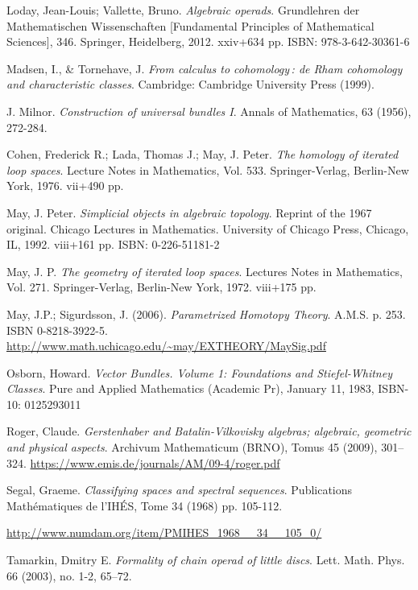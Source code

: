 \documentclass[TFM.tex]{subfiles}
\begin{document}
\begin{thebibliography}{}
 Loday, Jean-Louis; Vallette, Bruno. \emph{Algebraic operads}. Grundlehren der Mathematischen Wissenschaften [Fundamental Principles of Mathematical Sciences], 346. Springer, Heidelberg, 2012. xxiv+634 pp. ISBN: 978-3-642-30361-6

 Madsen, I., \& Tornehave, J. \emph{From calculus to cohomology : de Rham cohomology and characteristic classes}. Cambridge: Cambridge University Press (1999).

 J. Milnor. \emph{Construction of universal bundles I}. Annals of Mathematics, 63 (1956), 272-284. %


 Cohen, Frederick R.; Lada, Thomas J.; May, J. Peter. \emph{The homology of iterated loop spaces}. Lecture Notes in Mathematics, Vol. 533. Springer-Verlag, Berlin-New York, 1976. vii+490 pp. %


  May, J. Peter. \emph{Simplicial objects in algebraic topology}. Reprint of the 1967 original. Chicago Lectures in Mathematics. University of Chicago Press, Chicago, IL, 1992. viii+161 pp. ISBN: 0-226-51181-2


 May, J. P.
\emph{The geometry of iterated loop spaces}. 
Lectures Notes in Mathematics, Vol. 271. Springer-Verlag, Berlin-New York, 1972. viii+175 pp. 


 May, J.P.; Sigurdsson, J. (2006). \emph{Parametrized Homotopy Theory}. A.M.S. p. 253. ISBN 0-8218-3922-5. \url{http://www.math.uchicago.edu/~may/EXTHEORY/MaySig.pdf}


 Osborn, Howard. \emph{Vector Bundles. Volume 1: Foundations and Stiefel-Whitney Classes}. Pure and Applied Mathematics (Academic Pr), January 11, 1983, ISBN-10: 0125293011


 Roger, Claude. \emph{Gerstenhaber and Batalin-Vilkovisky algebras; algebraic, geometric and physical aspects}. Archivum Mathematicum (BRNO), Tomus 45 (2009), 301–324. \url{https://www.emis.de/journals/AM/09-4/roger.pdf}


 Segal, Graeme. \emph{Classifying spaces and spectral sequences}. Publications Mathématiques de l'IHÉS, Tome 34 (1968) pp. 105-112.

 \url{http://www.numdam.org/item/PMIHES_1968__34__105_0/} %


 Tamarkin, Dmitry E. \emph{Formality of chain operad of little discs}. Lett. Math. Phys. 66 (2003), no. 1-2, 65–72. 



\end{thebibliography}
\end{document}
